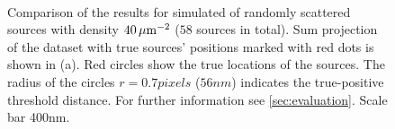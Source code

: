 \begin{figure}[p]
	\centering
	\newcommand{\sizef}{.95}
	\\
	\caption{Comparison of the results for simulated of randomly scattered sources with density $40\, \mathrm{\mu m}^{-2}$ ($58$ sources in total). Sum projection of the dataset with true sources' positions marked with red dots is shown in (a). Red circles show the true locations of the sources. The radius of the circles $r=0.7\unit{pixels}$ ($56\unit{nm}$) indicates the true-positive threshold distance. For further information see \autoref{sec:evaluation}. Scale bar 400\unit{nm}.}
	\label{fig:comparison density 40}
\end{figure}


